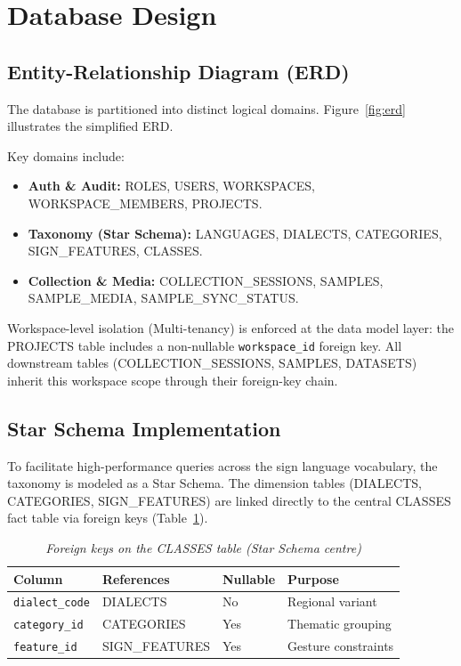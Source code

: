 \section{Database Design}

\subsection{Entity-Relationship Diagram (ERD)}
The database is partitioned into distinct logical domains. Figure~\ref{fig:erd} illustrates the simplified ERD.


Key domains include:
\begin{itemize}
    \item \textbf{Auth \& Audit:} ROLES, USERS, WORKSPACES, WORKSPACE\_MEMBERS, PROJECTS.
    \item \textbf{Taxonomy (Star Schema):} LANGUAGES, DIALECTS, CATEGORIES, SIGN\_FEATURES, CLASSES.
    \item \textbf{Collection \& Media:} COLLECTION\_SESSIONS, SAMPLES, SAMPLE\_MEDIA, SAMPLE\_SYNC\_STATUS.
\end{itemize}

Workspace-level isolation (Multi-tenancy) is enforced at the data model layer: the PROJECTS table includes a non-nullable \texttt{workspace\_id} foreign key. All downstream tables (COLLECTION\_SESSIONS, SAMPLES, DATASETS) inherit this workspace scope through their foreign-key chain. 

\subsection{Star Schema Implementation}
To facilitate high-performance queries across the sign language vocabulary, the taxonomy is modeled as a Star Schema. The dimension tables (DIALECTS, CATEGORIES, SIGN\_FEATURES) are linked directly to the central CLASSES fact table via foreign keys (Table~\ref{tab:star_schema_fks}).

\begin{table}[H]
\centering
\caption{\textit{Foreign keys on the CLASSES table (Star Schema centre)}}
\label{tab:star_schema_fks}
\small
\begin{tabular}{p{3.2cm} p{3.0cm} p{1.8cm} p{4.5cm}}
\toprule
\textbf{Column} & \textbf{References} & \textbf{Nullable} & \textbf{Purpose} \\
\midrule
\texttt{dialect\_code} & DIALECTS & No  & Regional variant \\
\texttt{category\_id}  & CATEGORIES & Yes & Thematic grouping \\
\texttt{feature\_id}   & SIGN\_FEATURES & Yes & Gesture constraints \\
\bottomrule
\end{tabular}
\end{table}

